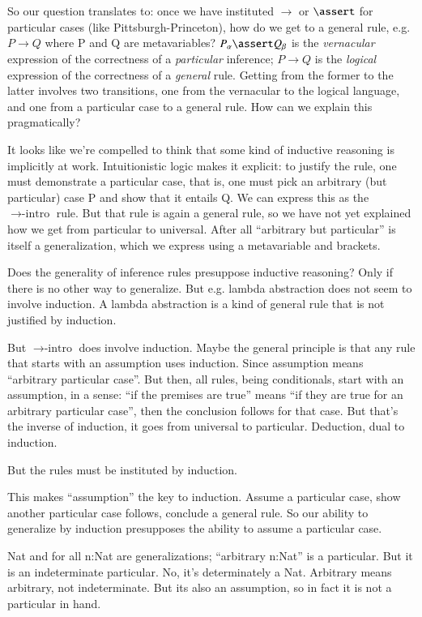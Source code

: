 \documentclass{article}
\begin{document}
So our question translates to: once we have instituted \(\rightarrow\)
or \(\linfer\) for particular cases (like Pittsburgh-Princeton), how do
we get to a general rule, e.g. \(P\rightarrow Q\) where P and Q are
metavariables? \(P_{\alpha}\linfer Q_{\beta}\) is the
\textit{vernacular} expression of the correctness of a
\textit{particular} inference; \(P\rightarrow Q\) is the
\textit{logical} expression of the correctness of a \textit{general}
rule. Getting from the former to the latter involves two transitions,
one from the vernacular to the logical language, and one from a
particular case to a general rule. How can we explain this
pragmatically?

It looks like we're compelled to think that some kind of inductive
reasoning is implicitly at work. Intuitionistic logic makes it
explicit: to justify the rule, one must demonstrate a particular case,
that is, one must pick an arbitrary (but particular) case P and show
that it entails Q. We can express this as the
\(\rightarrow\scriptstyle{\text{-intro}}\) rule. But that rule is
again a general rule, so we have not yet explained how we get from
particular to universal. After all ``arbitrary but particular'' is
itself a generalization, which we express using a metavariable and
brackets.

Does the generality of inference rules presuppose inductive reasoning?
Only if there is no other way to generalize. But e.g. lambda
abstraction does not seem to involve induction. A lambda abstraction
is a kind of general rule that is not justified by induction.

But \(\rightarrow\scriptstyle{\text{-intro}}\) does involve induction.
Maybe the general principle is that any rule that starts with an
assumption uses induction. Since assumption means ``arbitrary
particular case''. But then, all rules, being conditionals, start with
an assumption, in a sense: ``if the premises are true'' means ``if
they are true for an arbitrary particular case'', then the conclusion
follows for that case. But that's the inverse of induction, it goes
from universal to particular. Deduction, dual to induction.

But the rules must be instituted by induction.

This makes ``assumption'' the key to induction. Assume a particular
case, show another particular case follows, conclude a general rule.
So our ability to generalize by induction presupposes the ability to
assume a particular case.

Nat and for all n:Nat are generalizations; ``arbitrary n:Nat'' is a
particular. But it is an indeterminate particular. No, it's
determinately a Nat. Arbitrary means arbitrary, not indeterminate. But
its also an assumption, so in fact it is not a particular in hand.
\end{document}
